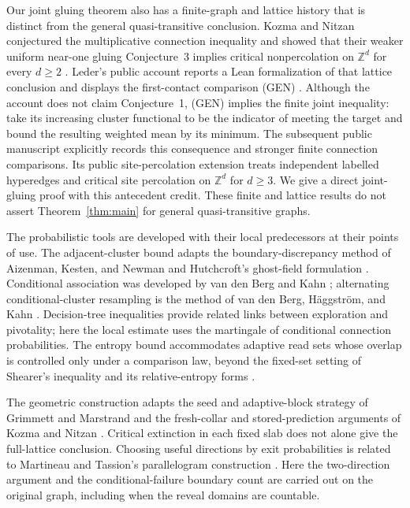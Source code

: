 \documentclass[11pt]{article}
\theoremstyle{definition}
\begin{document}
Our joint gluing theorem also has a finite-graph and lattice history
that is distinct from the general quasi-transitive conclusion.
Kozma and Nitzan conjectured the multiplicative connection inequality
\cite[Conjecture~1]{KozmaNitzan2024} and showed that their weaker
uniform near-one gluing Conjecture~3 implies critical nonpercolation
on $\mathbb Z^d$ for every $d\ge2$ \cite[Theorem~6]{KozmaNitzan2024}.
Leder's public account reports a Lean formalization of that lattice
conclusion and displays the first-contact comparison (GEN)
\cite[Section~3.4]{Leder2026}. Although the account does not claim
Conjecture~1, (GEN) implies the finite joint inequality: take its
increasing cluster functional to be the indicator of meeting the
target and bound the resulting weighted mean by its minimum.
The subsequent public manuscript \cite{ConnectionInequalities2026}
explicitly records this consequence and stronger finite connection
comparisons. Its public site-percolation extension
\cite{SiteCriticality2026} treats independent labelled hyperedges
and critical site percolation on $\mathbb Z^d$ for $d\ge3$. We give a direct
joint-gluing proof with this antecedent credit. These finite and
lattice results do not assert Theorem~\ref{thm:main} for general
quasi-transitive graphs.

The probabilistic tools are developed with their local predecessors
at their points of use. The adjacent-cluster bound adapts the
boundary-discrepancy method of Aizenman, Kesten, and Newman
\cite[Section~3]{AizenmanKestenNewman1987} and Hutchcroft's
ghost-field formulation \cite[Section~3]{Hutchcroft2020Locality}.
Conditional association was developed by van den Berg and Kahn
\cite{VanDenBergKahn2001}; alternating conditional-cluster resampling
is the method of van den Berg, H\"aggstr\"om, and Kahn
\cite{VanDenBergHaggstromKahn2006}. Decision-tree inequalities
\cite{OSSS2005,DuminilCopinRaoufiTassion2019} provide related links
between exploration and pivotality; here the local estimate uses
the martingale of conditional connection probabilities. The entropy
bound accommodates adaptive read sets whose overlap is controlled
only under a comparison law, beyond the fixed-set setting of
Shearer's inequality and its relative-entropy forms
\cite{ChungGrahamFranklShearer1986,MadimanTetali2010}.

The geometric construction adapts the seed and adaptive-block
strategy of Grimmett and Marstrand \cite{GrimmettMarstrand1990}
and the fresh-collar and stored-prediction arguments of Kozma and
Nitzan \cite[Lemma~10 and proof of Theorem~6]{KozmaNitzan2024}.
Critical extinction in each fixed slab
\cite{DuminilCopinSidoraviciusTassion2016Slabs} does not alone give
the full-lattice conclusion. Choosing useful directions by exit
probabilities is related to Martineau and Tassion's parallelogram
construction \cite{MartineauTassion2017}. Here the two-direction
argument and the conditional-failure boundary count are carried out
on the original graph, including when the reveal domains are countable.
\end{document}
